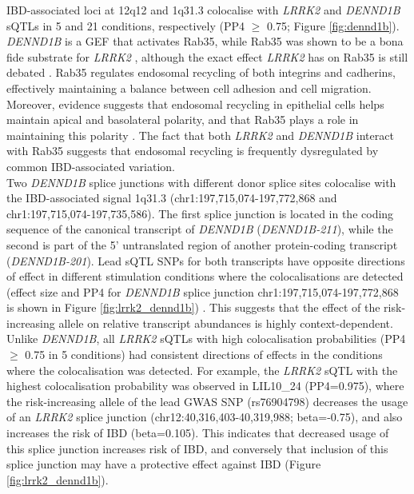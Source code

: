 IBD-associated loci at 12q12 and 1q31.3 colocalise with \textit{LRRK2} and \textit{DENND1B} sQTLs in 5 and 21 conditions, respectively (PP4 $\geq$ 0.75; Figure \ref{fig:dennd1b}). \textit{DENND1B} is a GEF that activates Rab35, while Rab35 was shown to be a bona fide substrate for \textit{LRRK2} \cite{Steger2016-yl,Bae2018-pu}, although the exact effect \textit{LRRK2} has on Rab35 is still debated \cite{Bae2018-pu,Bonet-Ponce2020-ri,Lee2021-ff}. Rab35 regulates endosomal recycling of both integrins and cadherins, effectively maintaining a balance between cell adhesion and cell migration. Moreover, evidence suggests that endosomal recycling in epithelial cells helps maintain apical and basolateral polarity, and that Rab35 plays a role in maintaining this polarity \cite{Mrozowska2016-lm,Kinoshita2020-yl}. The fact that both \textit{LRRK2} and \textit{DENND1B} interact with Rab35 suggests that endosomal recycling is frequently dysregulated by common IBD-associated variation. \\

Two \textit{DENND1B} splice junctions with different donor splice sites colocalise with the IBD-associated signal 1q31.3 (chr1:197,715,074-197,772,868 and chr1:197,715,074-197,735,586). The first splice junction is located in the coding sequence of the canonical transcript of \textit{DENND1B} (\textit{DENND1B-211}), while the second is part of the 5' untranslated region of another protein-coding transcript (\textit{DENND1B-201}). Lead sQTL SNPs for both transcripts have opposite directions of effect in different stimulation conditions where the colocalisations are detected (effect size and PP4 for \textit{DENND1B} splice junction chr1:197,715,074-197,772,868 is shown in Figure \ref{fig:lrrk2_dennd1b}) . This suggests that the effect of the risk-increasing allele on relative transcript abundances is highly context-dependent. \\

Unlike \textit{DENND1B}, all \textit{LRRK2} sQTLs with high colocalisation probabilities (PP4 $\geq$ 0.75 in 5 conditions) had consistent directions of effects in the conditions where the colocalisation was detected. For example, the \textit{LRRK2} sQTL with the highest colocalisation probability was observed in LIL10\_24 (PP4=0.975), where the risk-increasing allele of the lead GWAS SNP (rs76904798) decreases the usage of an \textit{LRRK2} splice junction (chr12:40,316,403-40,319,988; beta=-0.75), and also increases the risk of IBD (beta=0.105). This indicates that decreased usage of this splice junction increases risk of IBD, and conversely that inclusion of this splice junction may have a protective effect against IBD (Figure \ref{fig:lrrk2_dennd1b}). \\

